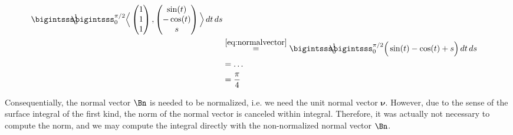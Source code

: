 \documentclass[12pt]{article}
\begin{document}
\begin{enumerate}[(i)]
\begin{align}
		      \bigintsss_{0}^{1} \!\!\!\!\! \bigintsss_{0}^{\pi/2}
		      \Big\langle \begin{pmatrix} 1\\1\\1\end{pmatrix}, 
		      \begin{pmatrix} \sin(t) \\ -\cos(t) \\  s \end{pmatrix}
		      \Big\rangle  \, dt \,ds                                                                          \\
		       & 
		      \stackrel{\eqref{eq:normalvector}}{=}
		      \bigintsss_{0}^{1} \!\!\!\!\! \bigintsss_{0}^{\pi/2}
		      \Big( \sin(t) - \cos(t) + s \Big)
		      \, dt \,ds                                                                                       \\
		       & = \dots                                                                                       \\
		       & = \frac{\pi}{4}
	      \end{align}
	      
	      Consequentially, the normal vector $\Bn$ is needed to be normalized, i.e. 
	      we need the unit normal vector $\bm{\nu}$.
	      However, due to the sense of the surface integral of the first kind,
	      the norm of the normal vector is canceled within integral.
	      Therefore, it was actually not necessary to compute the norm, 
	      and we may compute the integral directly with the non-normalized normal vector $\Bn$.
\end{enumerate}


% 
\end{document}
